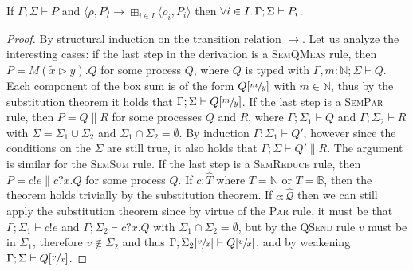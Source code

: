\begin{theorem}
  If $\Gamma; \Sigma \vdash P$ and $\langle \rho, P \rangle \longrightarrow \boxplus_{i \in I} \langle \rho_i, P_i \rangle$ then
  $\forall i \in I \ldotp \Gamma; \Sigma \vdash P_i$.
\end{theorem}
\begin{proof}
  By structural induction on the transition relation $\longrightarrow$.
  Let us analyze the interesting cases: if the last step in the derivation is a \textsc{SemQMeas} rule, then $P = M(\widetilde{x} \rhd y).Q$ for some process $Q$,
  where $Q$ is typed with $\Gamma, m : \mathbb{N}; \Sigma \vdash Q$. Each component of the box sum is of the form $Q[\sfrac{m}{y}]$ with $m \in \mathbb{N}$, thus
  by the substitution theorem it holds that $\Gamma; \Sigma \vdash Q[\sfrac{m}{y}]$.
  If the last step is a \textsc{SemPar} rule, then $P = Q \parallel R$ for some processes $Q$ and $R$, where
  $\Gamma; \Sigma_1 \vdash Q$ and $\Gamma; \Sigma_2 \vdash R$ with $\Sigma = \Sigma_1 \cup \Sigma_2$ and $\Sigma_1 \cap \Sigma_2 = \emptyset$.
  By induction $\Gamma; \Sigma_1 \vdash Q'$, however since the conditions on the $\Sigma$ are still true, it also holds that $\Gamma; \Sigma \vdash Q' \parallel R$.
  The argument is similar for the \textsc{SemSum} rule.
  If the last step is a \textsc{SemReduce} rule, then $P = c!e \parallel c?x.Q$ for some process $Q$. If $c : \hat{T}$ where $T = \mathbb{N}$ or $T = \mathbb{B}$, then
  the theorem holds trivially by the substitution theorem. If $c : \hat{\mathcal{Q}}$ then we can still apply the substitution theorem since by virtue of the \textsc{Par} rule,
  it must be that $\Gamma; \Sigma_1 \vdash c!e$ and $\Gamma; \Sigma_2 \vdash c?x.Q$ with $\Sigma_1 \cap \Sigma_2 = \emptyset$, but by the \textsc{QSend} rule $v$ must be in $\Sigma_1$,
  therefore $v \not\in \Sigma_2$ and thus $\Gamma; \Sigma_2[\sfrac{v}{x}] \vdash Q[\sfrac{v}{x}]$, and by weakening $\Gamma; \Sigma \vdash Q[\sfrac{v}{x}]$.
\end{proof}
